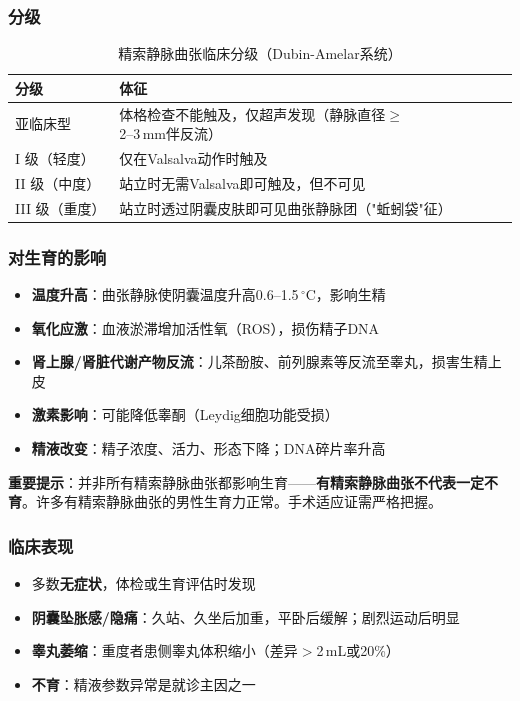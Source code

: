 \subsubsection{分级}

\begin{table}[htbp]
\centering
\caption{精索静脉曲张临床分级（Dubin-Amelar系统）}
\label{tab:varicocele_grade}
\begin{tabularx}{\textwidth}{@{}lX@{}}
    \toprule
    \textbf{分级} & \textbf{体征} \\
    \midrule
    亚临床型 & 体格检查不能触及，仅超声发现（静脉直径$\ge$2--3\,mm伴反流） \\
    I 级（轻度） & 仅在Valsalva动作时触及 \\
    II 级（中度） & 站立时无需Valsalva即可触及，但不可见 \\
    III 级（重度） & 站立时透过阴囊皮肤即可见曲张静脉团（"蚯蚓袋"征） \\
    \bottomrule
\end{tabularx}
\end{table}

\subsubsection{对生育的影响}

\begin{itemize}[leftmargin=2cm]
	\item \textbf{温度升高}：曲张静脉使阴囊温度升高0.6--1.5\,$^\circ$C，影响生精
	\item \textbf{氧化应激}：血液淤滞增加活性氧（ROS），损伤精子DNA
	\item \textbf{肾上腺/肾脏代谢产物反流}：儿茶酚胺、前列腺素等反流至睾丸，损害生精上皮
	\item \textbf{激素影响}：可能降低睾酮（Leydig细胞功能受损）
	\item \textbf{精液改变}：精子浓度、活力、形态下降；DNA碎片率升高
\end{itemize}

\textbf{重要提示}：并非所有精索静脉曲张都影响生育——\textbf{有精索静脉曲张不代表一定不育}。许多有精索静脉曲张的男性生育力正常。手术适应证需严格把握。

\subsubsection{临床表现}

\begin{itemize}[leftmargin=2cm]
	\item 多数\textbf{无症状}，体检或生育评估时发现
	\item \textbf{阴囊坠胀感/隐痛}：久站、久坐后加重，平卧后缓解；剧烈运动后明显
	\item \textbf{睾丸萎缩}：重度者患侧睾丸体积缩小（差异$>$2\,mL或20\%）
	\item \textbf{不育}：精液参数异常是就诊主因之一
\end{itemize}

